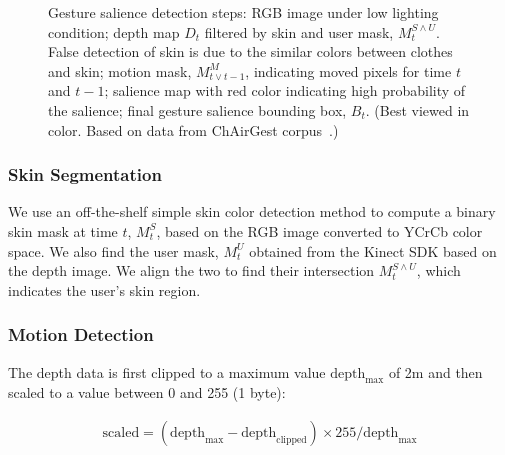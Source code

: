 \begin{figure}[tb]
{}
\caption{Gesture salience detection steps:  RGB image under low lighting condition;
 depth map $D_t$ filtered by skin and user mask, $M_t^{S\wedge U}$. False detection of skin is due to
the similar colors between clothes and skin;  motion mask,  $M_{t\vee t-1}^M$, indicating moved pixels for time $t$ and $t-1$;
 salience map with red color indicating high probability of the salience;
 final gesture salience bounding box, $B_t$. (Best viewed in
color. Based on data from ChAirGest corpus~\cite{Ruffieux2013}.)}
\label{fig:gesture-salience}
\end{figure}

\subsubsection{Skin Segmentation}
We use an off-the-shelf simple skin color detection method to compute a binary skin mask at
time $t$, $M_t^S$, based on the RGB image converted to YCrCb color space. We
also find the user mask, $M_t^U$ obtained from the Kinect SDK based on the depth image.
We align the two to find their intersection $M_t^{S\wedge U}$, which indicates the user's skin region.

\subsubsection{Motion Detection}
The depth data is first clipped to a maximum value $\text{depth}_\text{max}$ of
2m and then scaled to a value between 0 and 255 (1 byte):

\begin{align*}
\text{scaled} = (\text{depth}_\text{max} -
\text{depth}_\text{clipped}) \times 255 / \text{depth}_\text{max}
\end{align*}

